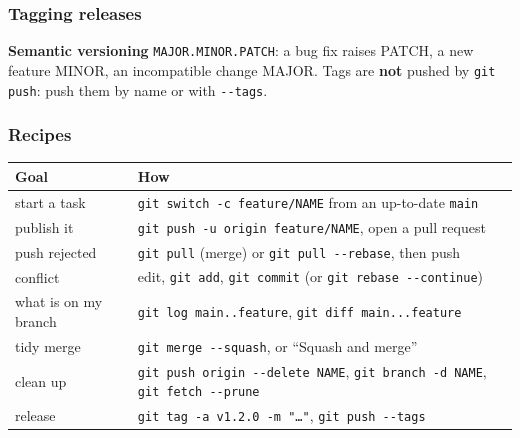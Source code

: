 \documentclass[aspectratio=169,10pt,compress]{beamer}
\begin{document}
\begin{frame}[t,fragile] \frametitle{Tagging releases}

  \vspace{0.1em}
  \small
  \textbf{Semantic versioning} \texttt{MAJOR.MINOR.PATCH}: a bug fix raises PATCH, a new feature MINOR, an incompatible change MAJOR.
  Tags are \textbf{not} pushed by \texttt{git push}: push them by name or with \texttt{-{}-tags}.
\end{frame}





\begin{frame}[t,fragile] \frametitle{Recipes}
  \begin{center}\footnotesize
  \begin{tabular}{ll}
    \toprule
    \textbf{Goal} & \textbf{How} \\
    \midrule
    start a task              & \texttt{git switch -c feature/NAME} from an up-to-date \texttt{main} \\
    publish it                & \texttt{git push -u origin feature/NAME}, open a pull request \\
    push rejected             & \texttt{git pull} (merge) or \texttt{git pull -{}-rebase}, then push \\
    conflict                  & edit, \texttt{git add}, \texttt{git commit} (or \texttt{git rebase -{}-continue}) \\
    what is on my branch      & \texttt{git log main..feature}, \texttt{git diff main...feature} \\
    tidy merge                & \texttt{git merge -{}-squash}, or ``Squash and merge'' \\
    clean up                  & \texttt{git push origin -{}-delete NAME}, \texttt{git branch -d NAME}, \texttt{git fetch -{}-prune} \\
    release                   & \texttt{git tag -a v1.2.0 -m "\dots"}, \texttt{git push -{}-tags} \\
    \bottomrule
  \end{tabular}
  \end{center}
\end{frame}
\end{document}
